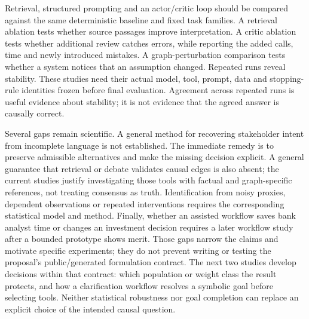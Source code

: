 Retrieval, structured prompting and an actor/critic loop should be
compared against the same deterministic baseline and fixed task
families. A retrieval ablation tests whether source passages improve
interpretation. A critic ablation tests whether additional review
catches errors, while reporting the added calls, time and newly
introduced mistakes. A graph-perturbation comparison tests whether a
system notices that an assumption changed. Repeated runs reveal
stability. These studies need their actual model, tool, prompt, data and
stopping-rule identities frozen before final evaluation. Agreement
across repeated runs is useful evidence about stability; it is not
evidence that the agreed answer is causally correct.

Several gaps remain scientific. A general method for recovering
stakeholder intent from incomplete language is not established. The
immediate remedy is to preserve admissible alternatives and make the
missing decision explicit. A general guarantee that retrieval or debate
validates causal edges is also absent; the current studies justify
investigating those tools with factual and graph-specific references,
not treating consensus as truth. Identification from noisy proxies,
dependent observations or repeated interventions requires the
corresponding statistical model and method. Finally, whether an assisted
workflow saves bank analyst time or changes an investment decision
requires a later workflow study after a bounded prototype shows merit.
Those gaps narrow the claims and motivate specific experiments; they do
not prevent writing or testing the proposal's public/generated
formulation contract. The next two studies develop decisions within that
contract: which population or weight class the result protects, and how a
clarification workflow resolves a symbolic goal before selecting tools.
Neither statistical robustness nor goal completion can replace an explicit
choice of the intended causal question. \label{exec13:formulation-end}
